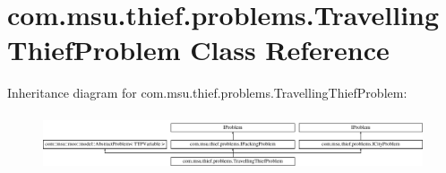 \hypertarget{classcom_1_1msu_1_1thief_1_1problems_1_1TravellingThiefProblem}{\section{com.\-msu.\-thief.\-problems.\-Travelling\-Thief\-Problem Class Reference}
\label{classcom_1_1msu_1_1thief_1_1problems_1_1TravellingThiefProblem}
}
Inheritance diagram for com.\-msu.\-thief.\-problems.\-Travelling\-Thief\-Problem\-:\begin{figure}[H]
\begin{center}
\leavevmode
\includegraphics[height=1.686747cm]{classcom_1_1msu_1_1thief_1_1problems_1_1TravellingThiefProblem}
\end{center}
\end{figure}
